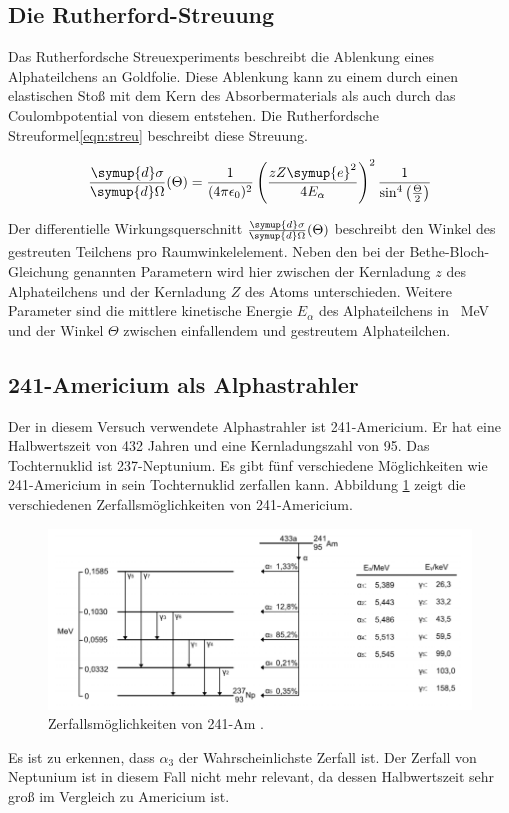 \subsection{Die Rutherford-Streuung}
Das Rutherfordsche Streuexperiments beschreibt die Ablenkung eines Alphateilchens
an Goldfolie. Diese Ablenkung kann zu einem durch einen elastischen Stoß mit
dem Kern des Absorbermaterials als auch durch das Coulombpotential von diesem
entstehen. Die Rutherfordsche Streuformel\eqref{eqn:streu} beschreibt diese Streuung.

\begin{equation}
  \frac{\symup{d} \sigma}{\symup{d} \Omega} (\Theta) =
  \frac{1}{(4 \pi \epsilon_0)^2} \left(\frac{{z} {Z} \symup{e}^2}
  {4 {E}_\alpha}\right)^2 \frac{1}{\sin^4\left(\frac{\Theta}{2}\right)}
  \label{eqn:streu}
\end{equation}

Der differentielle Wirkungsquerschnitt $\frac{\symup{d} \sigma}{\symup{d} \Omega} (\Theta)$
beschreibt den Winkel des gestreuten Teilchens pro Raumwinkelelement. Neben den
bei der Bethe-Bloch-Gleichung genannten Parametern wird hier zwischen der
Kernladung $z$ des Alphateilchens und der Kernladung $Z$ des Atoms unterschieden.
Weitere Parameter sind die mittlere kinetische Energie ${E}_\alpha$ des
Alphateilchens in \SI{}{\mega\electronvolt} und der Winkel $\Theta$ zwischen
einfallendem und gestreutem Alphateilchen.

\subsection{241-Americium als Alphastrahler}
Der in diesem Versuch verwendete Alphastrahler ist 241-Americium. Er hat eine
Halbwertszeit von 432 Jahren und eine Kernladungszahl von 95. Das Tochternuklid
ist 237-Neptunium. Es gibt fünf verschiedene Möglichkeiten wie 241-Americium in
sein Tochternuklid zerfallen kann. Abbildung \ref{fig:amnp} zeigt die
verschiedenen Zerfallsmöglichkeiten von 241-Americium.

\begin{figure}[H]
  \centering
  \includegraphics[width=\textwidth]{zerfall.png}
  \caption{Zerfallsmöglichkeiten von 241-Am  \cite{potsdam}.}
  \label{fig:amnp}
\end{figure}

Es ist zu erkennen, dass $\alpha_3$ der Wahrscheinlichste Zerfall ist. Der Zerfall
von Neptunium ist in diesem Fall nicht mehr relevant, da dessen Halbwertszeit
sehr groß im Vergleich zu Americium ist.
